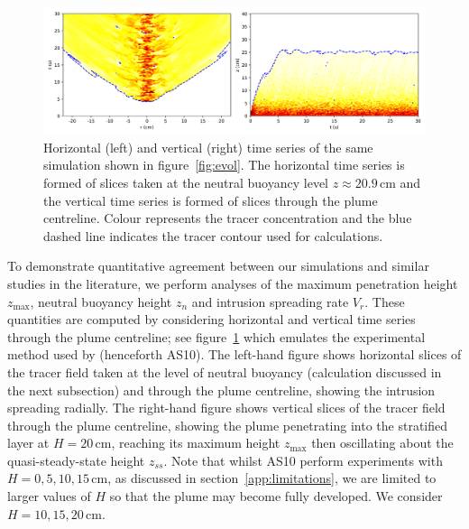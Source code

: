 \documentclass[a4paper]{article}
\begin{document}
\begin{figure}
	\centering
	\includegraphics[width=.9\textwidth]{timeseries}
	\caption{Horizontal (left) and vertical (right) time series of the same simulation shown in
		figure~\ref{fig:evol}. The horizontal time series is formed of slices taken at the neutral buoyancy
		level $z \approx 20.9 \, \mathrm{cm}$ and the vertical time series is formed of slices through the
		plume centreline. Colour represents the tracer concentration and the blue dashed line indicates the
		tracer contour used for calculations.}
	\label{fig:timeseries}
\end{figure}

To demonstrate quantitative agreement between our simulations and similar studies in the literature, we
perform analyses of the maximum penetration height $z_{\max}$, neutral buoyancy height $z_n$ and intrusion
spreading rate $V_r$. These quantities are computed by considering horizontal and vertical time series through
the plume centreline; see figure~\ref{fig:timeseries} which emulates the experimental method used by
\citet{ansong2008} (henceforth AS10). The left-hand figure shows horizontal slices of the tracer field taken
at the level of neutral buoyancy (calculation discussed in the next subsection) and through the plume
centreline, showing the intrusion spreading radially. The right-hand figure shows vertical slices of the
tracer field through the plume centreline, showing the plume penetrating into the stratified layer at $H=20 \,
\mathrm{cm}$, reaching its maximum height $z_{\max}$ then oscillating about the quasi-steady-state height
$z_{ss}$. Note that whilst AS10 perform experiments with $H = 0, 5, 10, 15 \, \mathrm{cm}$, as discussed in
section~\ref{app:limitations}, we are limited to larger values of $H$ so that the plume may become fully
developed. We consider $H = 10, 15, 20 \,\mathrm{cm}$.
\end{document}
